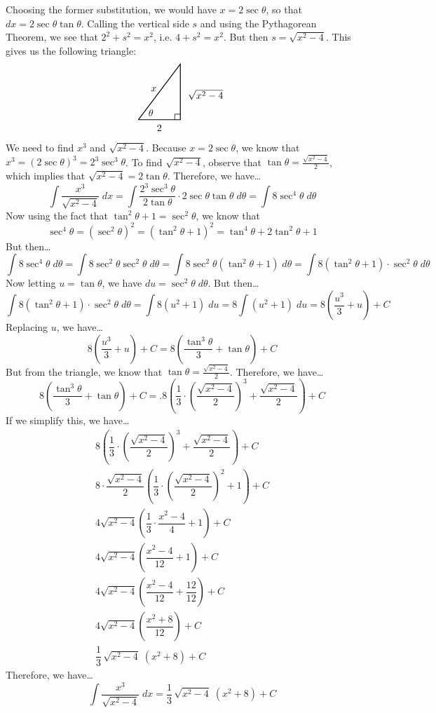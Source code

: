 \documentclass[11pt,letterpaper]{article}
\begin{document}
Choosing the former substitution, we would have $x= 2 \sec \theta$, so that $dx= 2 \sec \theta \tan \theta$. Calling the vertical side $s$ and using the Pythagorean Theorem, we see that $2^2 + s^2= x^2$, i.e. $4 + s^2= x^2$. But then $s= \sqrt{x^2 - 4}$. This gives us the following triangle: 
	\[
	\begin{tikzpicture}
	\draw[line width=0.03cm] (0,0) -- (1.5,0) -- (1.5,2) -- (0,0);
	\draw[line width=0.02cm] (1.3,0) -- (1.3,0.2) -- (1.5,0.2);
	\node at (0.45,0.25) {$\theta$};
	\node at (0.55,1.1) {$x$};
	\node at (0.75,-0.3) {$2$};
	\node at (2.4,0.9) {$\sqrt{x^2 - 4}$};
	\end{tikzpicture}
	\]
We need to find $x^3$ and $\sqrt{x^2 - 4}$. Because $x= 2 \sec \theta$, we know that $x^3= (2 \sec \theta)^3= 2^3 \sec^3 \theta$. To find $\sqrt{x^2 - 4}$, observe that $\tan \theta= \frac{\sqrt{x^2 - 4}}{2}$, which implies that $\sqrt{x^2 - 4}= 2 \tan \theta$. Therefore, we have\dots
	\[
	\int \dfrac{x^3}{\sqrt{x^2 - 4}} \;dx= \int \dfrac{2^3 \sec^3 \theta}{2 \tan \theta} \cdot 2 \sec \theta \tan \theta \;d\theta= \int 8 \sec^4 \theta \;d\theta
	\]
Now using the fact that $\tan^2 \theta + 1= \sec^2 \theta$, we know that 
	\[
	\sec^4 \theta= (\sec^2 \theta)^2= (\tan^2 \theta + 1)^2= \tan^4 \theta + 2 \tan^2 \theta + 1
	\]
But then\dots
	\[
	\int 8 \sec^4 \theta \;d\theta= \int 8 \sec^2 \theta \sec^2 \theta \;d\theta= \int 8 \sec^2 \theta (\tan^2 \theta + 1) \;d\theta= \int 8(\tan^2 \theta + 1) \cdot \sec^2 \theta \;d\theta
	\]
Now letting $u= \tan \theta$, we have $du= \sec^2 \theta \;d\theta$. But then\dots
	\[
	\int 8(\tan^2 \theta + 1) \cdot \sec^2 \theta \;d\theta= \int 8(u^2 + 1) \;du= 8 \int (u^2 + 1) \;du= 8 \left( \dfrac{u^3}{3} + u \right) + C
	\]
Replacing $u$, we have\dots
	\[
	8 \left( \dfrac{u^3}{3} + u \right) + C= 8 \left( \dfrac{\tan^3 \theta}{3} + \tan \theta \right) + C
	\]
But from the triangle, we know that $\tan \theta= \frac{\sqrt{x^2 - 4}}{2}$. Therefore, we have\dots
	\[
	8 \left( \dfrac{\tan^3 \theta}{3} + \tan \theta \right) + C=. 8 \left( \dfrac{1}{3} \cdot \left( \dfrac{\sqrt{x^2 - 4}}{2} \right)^3 + \dfrac{\sqrt{x^2 - 4}}{2} \right) + C
	\]
If we simplify this, we have\dots
	\[
	\begin{gathered}
	8 \left( \dfrac{1}{3} \cdot \left( \dfrac{\sqrt{x^2 - 4}}{2} \right)^3 + \dfrac{\sqrt{x^2 - 4}}{2} \right) + C \\
	8 \cdot \dfrac{\sqrt{x^2 - 4}}{2} \left( \dfrac{1}{3} \cdot \left( \dfrac{\sqrt{x^2 - 4}}{2} \right)^2 + 1 \right) + C \\
	4 \sqrt{x^2 - 4} \left( \dfrac{1}{3} \cdot \dfrac{x^2 - 4}{4} + 1 \right) + C \\
	4 \sqrt{x^2 - 4} \left( \dfrac{x^2 - 4}{12} + 1 \right) + C \\
	4 \sqrt{x^2 - 4} \left( \dfrac{x^2 - 4}{12} + \dfrac{12}{12} \right) + C \\
	4 \sqrt{x^2 - 4} \left( \dfrac{x^2 + 8}{12}\right) + C \\
	\dfrac{1}{3}\, \sqrt{x^2 - 4}\; (x^2 + 8) + C
	\end{gathered}
	\]
Therefore, we have\dots
	\[
	\int \dfrac{x^3}{\sqrt{x^2 - 4}} \;dx= \dfrac{1}{3}\, \sqrt{x^2 - 4}\; (x^2 + 8) + C
	\]
\end{document}
